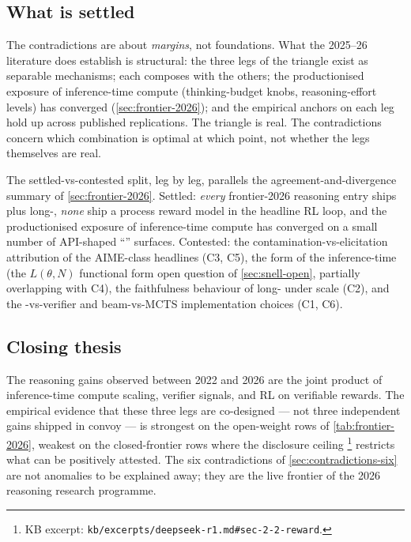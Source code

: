 \subsection{What is settled}
\label{sec:contradictions-settled}

\begin{intuition}
The contradictions are about \emph{margins}, not foundations. What
the 2025--26 literature does establish is structural: the three legs
of the triangle exist as separable mechanisms; each composes with the
others; the productionised exposure of inference-time compute
(thinking-budget knobs, reasoning-effort levels) has converged
(\cref{sec:frontier-2026}); and the empirical anchors on each leg
\citep{snell2024,lightman2023-prm800k,shao2024,deepseek-r1,dapo2025,s1-2025}
hold up across published replications. The triangle is real. The
contradictions concern which combination is optimal at which point, not
whether the legs themselves are real.
\end{intuition}

The settled-vs-contested split, leg by leg, parallels the
agreement-and-divergence summary of
\cref{sec:frontier-2026}. Settled: \emph{every} frontier-2026 reasoning
entry ships  plus long-, \emph{none} ship a process reward
model in the headline RL loop, and the productionised exposure of
inference-time compute has converged on a small number of API-shaped
``'' surfaces. Contested: the contamination-vs-elicitation
attribution of the AIME-class headlines (C3, C5), the form of the
inference-time  (the $L(\theta, N)$ functional form open
question of \cref{sec:snell-open}, partially overlapping with C4), the
faithfulness behaviour of long- under scale (C2), and the
-vs-verifier and beam-vs-MCTS implementation choices (C1, C6).

\subsection{Closing thesis}
\label{sec:contradictions-closing}

The reasoning gains observed between 2022 and 2026 are the joint
product of inference-time compute scaling, verifier signals, and RL on
verifiable rewards. The empirical evidence that these three legs are
co-designed --- not three independent gains shipped in convoy --- is
strongest on the open-weight rows of \cref{tab:frontier-2026},
weakest on the closed-frontier rows where the disclosure ceiling
\citep[\S 2.2]{deepseek-r1}\footnote{KB excerpt:
\nolinkurl{kb/excerpts/deepseek-r1.md#sec-2-2-reward}.} restricts what
can be positively attested. The six contradictions of
\cref{sec:contradictions-six} are not anomalies to be explained away;
they are the live frontier of the 2026 reasoning research programme.

